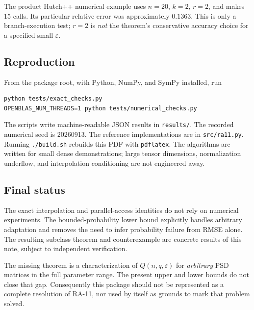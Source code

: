 \documentclass[11pt]{article}
\theoremstyle{definition}\newtheorem{definition}[theorem]{Definition}
\theoremstyle{remark}\newtheorem{remark}[theorem]{Remark}
\newcommand{\eps}{\varepsilon}\newcommand{\Qprod}{Q_{\mathrm{prod}}}
\begin{document}
The product Hutch++ numerical example uses $n=20$, $k=2$, $r=2$, and makes
15 calls. Its particular relative error was approximately $0.1363$. This is
only a branch-execution test; $r=2$ is \emph{not} the theorem's conservative
accuracy choice for a specified small $\eps$.

\subsection{Reproduction}
From the package root, with Python, NumPy, and SymPy installed, run
\begin{verbatim}
python tests/exact_checks.py
OPENBLAS_NUM_THREADS=1 python tests/numerical_checks.py
\end{verbatim}
The scripts write machine-readable JSON results in \texttt{results/}.
The recorded numerical seed is 20260913. The reference implementations are in
\texttt{src/ra11.py}. Running \texttt{./build.sh} rebuilds this PDF with
\texttt{pdflatex}. The algorithms are written for small dense demonstrations;
large tensor dimensions, normalization underflow, and interpolation conditioning
are not engineered away.

\subsection{Final status}
The exact interpolation and parallel-access identities do not rely on numerical
experiments. The bounded-probability lower bound explicitly handles arbitrary
adaptation and removes the need to infer probability failure from RMSE alone.
The resulting subclass theorem and counterexample are concrete results of this
note, subject to independent verification.

The missing theorem is a characterization of $Q(n,q,\eps)$ for \emph{arbitrary}
PSD matrices in the full parameter range. The present upper and lower bounds
do not close that gap. Consequently this package should not be represented as
a complete resolution of RA-11, nor used by itself as grounds to mark that
problem solved.
\end{document}
